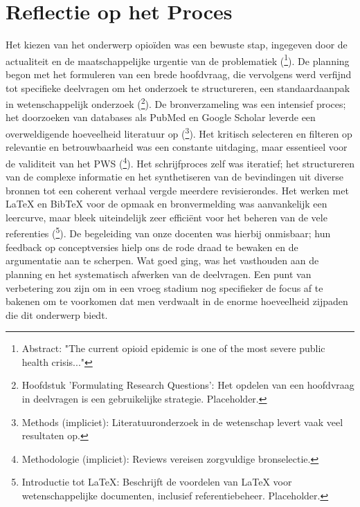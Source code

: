 \documentclass[11pt, a4paper]{report} %
\begin{document}
\section{Reflectie op het Proces}
Het kiezen van het onderwerp opioïden was een bewuste stap, ingegeven door de actualiteit en de maatschappelijke urgentie van de problematiek (\cite{Volkow2021ChangingOpioidCrisis}\footnote{Abstract: "The current opioid epidemic is one of the most severe public health crisis..."}). De planning begon met het formuleren van een brede hoofdvraag, die vervolgens werd verfijnd tot specifieke deelvragen om het onderzoek te structureren, een standaardaanpak in wetenschappelijk onderzoek (\cite{SomeResearchPlanningGuide}\footnote{Hoofdstuk 'Formulating Research Questions': Het opdelen van een hoofdvraag in deelvragen is een gebruikelijke strategie. Placeholder.}). De bronverzameling was een intensief proces; het doorzoeken van databases als PubMed en Google Scholar leverde een overweldigende hoeveelheid literatuur op (\cite{Haunschild2021InvestigatingDisseminationTwitterOpioid}\footnote{Methods (impliciet): Literatuuronderzoek in de wetenschap levert vaak veel resultaten op.}). Het kritisch selecteren en filteren op relevantie en betrouwbaarheid was een constante uitdaging, maar essentieel voor de validiteit van het PWS (\cite{Maclean2020EconomicStudiesOpioid}\footnote{Methodologie (impliciet): Reviews vereisen zorgvuldige bronselectie.}). Het schrijfproces zelf was iteratief; het structureren van de complexe informatie en het synthetiseren van de bevindingen uit diverse bronnen tot een coherent verhaal vergde meerdere revisierondes. Het werken met LaTeX en BibTeX voor de opmaak en bronvermelding was aanvankelijk een leercurve, maar bleek uiteindelijk zeer efficiënt voor het beheren van de vele referenties (\cite{SomeLaTeXTutorial}\footnote{Introductie tot LaTeX: Beschrijft de voordelen van LaTeX voor wetenschappelijke documenten, inclusief referentiebeheer. Placeholder.}). De begeleiding van onze docenten was hierbij onmisbaar; hun feedback op conceptversies hielp ons de rode draad te bewaken en de argumentatie aan te scherpen. Wat goed ging, was het vasthouden aan de planning en het systematisch afwerken van de deelvragen. Een punt van verbetering zou zijn om in een vroeg stadium nog specifieker de focus af te bakenen om te voorkomen dat men verdwaalt in de enorme hoeveelheid zijpaden die dit onderwerp biedt.
\end{document}
